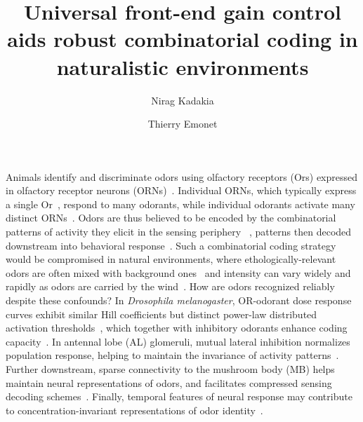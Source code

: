 \documentclass[9pt,twocolumn,twoside,lineno]{pnas-new}
\title{Universal front-end gain control aids robust combinatorial coding in naturalistic environments}
\author[a]{Nirag Kadakia}
\author[a,b]{Thierry Emonet}
\affil[a]{Department of Molecular, Cellular, and Developmental Biology}
\affil[b]{Department of Physics, Yale University, New Haven, CT 06511}
\begin{document}

\maketitle
\thispagestyle{firststyle}





Animals identify and discriminate odors using olfactory receptors (Ors) expressed in olfactory receptor neurons (ORNs)~\cite{Or_ORNs_maps, buck1991novel}. Individual ORNs, which typically express a single Or~\cite{buck1991novel}, respond to many odorants, while individual odorants activate many distinct ORNs~\cite{friedrich1997combinatorial,hallem_carlson,mosquito_combinatorial_coding,nara2011large}. Odors are  thus believed to be encoded by the combinatorial patterns of activity they elicit in the sensing periphery
~\cite{malnic1999combinatorial, mosquito_combinatorial_coding, hildebrand1997mechanisms, hallem_carlson, debryune_odor_coding, friedrich1997combinatorial}, patterns then decoded downstream into behavioral response~\cite{early_olfactory_processing}.  Such a combinatorial coding strategy would be compromised in natural environments, where ethologically-relevant odors are often mixed with background ones~\cite{odor_backgrounds} and intensity can vary widely and rapidly as odors are carried by the wind~\cite{murlis_odor_plumes, fluid_dynamics_chemosensory, celani, carde_navigation,celani,srinivas_elife}. How are odors recognized reliably despite these confounds? In \textit{Drosophila melanogaster}, OR-odorant dose response curves exhibit similar Hill coefficients but distinct power-law distributed activation thresholds~\cite{hallem_carlson, srinivas_elife, si2017invariances}, which together with inhibitory odorants enhance coding capacity~\cite{si2017invariances, Cao_Tu_WL, hallem_carlson}. In antennal lobe (AL) glomeruli, mutual lateral inhibition normalizes population response, helping to maintain the invariance of activity patterns~\cite{lateral_inh_asahina, divisive_normalization}. Further downstream, sparse connectivity to the mushroom body (MB) helps maintain neural representations of odors, and facilitates compressed sensing decoding schemes~\cite{abbott_axel, litwinkumar, vijay_1}. Finally, temporal features of neural response may contribute to concentration-invariant representations of odor identity~\cite{stopfer_nat_neuro, stopfer_temporal_model, stopfer_temporal_channel, primacy_coding}.
\end{document}
